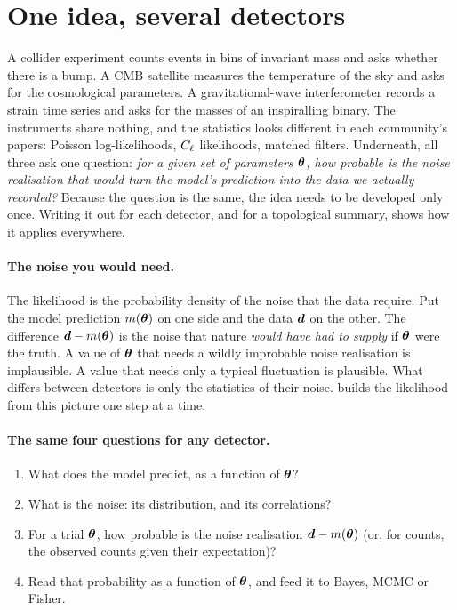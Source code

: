 \section{One idea, several detectors}\label{0a:sec:universal}

A collider experiment counts events in bins of invariant mass and asks whether
there is a bump. A CMB satellite measures the temperature of the sky and asks
for the cosmological parameters. A gravitational-wave interferometer records a
strain time series and asks for the masses of an inspiralling binary. The
instruments share nothing, and the statistics looks different in each
community's papers: Poisson log-likelihoods, $C_\ell$ likelihoods, matched
filters. Underneath, all three ask one question: \emph{for a given set of
parameters $\bm{\theta}$, how probable is the noise realisation that would turn
the model's prediction into the data we actually recorded?} Because the
question is the same, the idea needs to be developed only once. Writing it out
for each detector, and for a topological summary, shows how it applies
everywhere.

\paragraph{The noise you would need.}
The likelihood is the probability density of the noise that the data
require. Put the model prediction $m(\bm{\theta})$ on one side and the data
$\bm{d}$ on the other. The difference $\bm{d}-m(\bm{\theta})$ is the noise that
nature \emph{would have had to supply} if $\bm{\theta}$ were the truth. A value of
$\bm{\theta}$ that needs a wildly improbable noise realisation is implausible. A
value that needs only a typical fluctuation is plausible. What differs between
detectors is only the statistics of their noise.  builds the
likelihood from this picture one step at a time.

\paragraph{The same four questions for any detector.}
\begin{enumerate}[leftmargin=2em]
  \item What does the model predict, as a function of $\bm{\theta}$?
  \item What is the noise: its distribution, and its correlations?
  \item For a trial $\bm{\theta}$, how probable is the noise realisation $\bm{d}-m(\bm{\theta})$ (or, for counts, the observed counts given their expectation)?
  \item Read that probability as a function of $\bm{\theta}$, and feed it to Bayes, MCMC or Fisher.
\end{enumerate}


